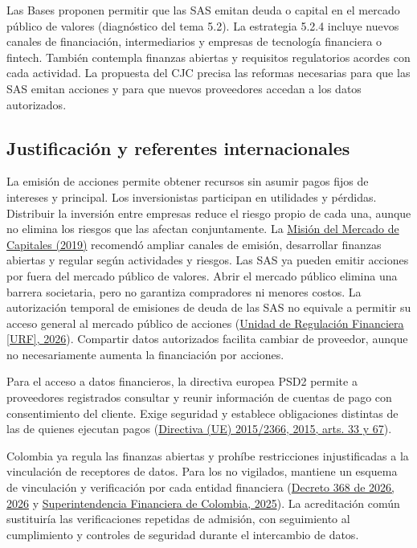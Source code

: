 Las Bases proponen permitir que las SAS emitan deuda o capital en el mercado público de valores (diagnóstico del tema 5.2). La estrategia 5.2.4 incluye nuevos canales de financiación, intermediarios y empresas de tecnología financiera o fintech. También contempla finanzas abiertas y requisitos regulatorios acordes con cada actividad. La propuesta del CJC precisa las reformas necesarias para que las SAS emitan acciones y para que nuevos proveedores accedan a los datos autorizados.

\subsection{Justificación y referentes internacionales}

La emisión de acciones permite obtener recursos sin asumir pagos fijos de intereses y principal. Los inversionistas participan en utilidades y pérdidas. Distribuir la inversión entre empresas reduce el riesgo propio de cada una, aunque no elimina los riesgos que las afectan conjuntamente. La \hyperref[ref:bib:mision2019]{Misión del Mercado de Capitales (2019)} recomendó ampliar canales de emisión, desarrollar finanzas abiertas y regular según actividades y riesgos. Las SAS ya pueden emitir acciones por fuera del mercado público de valores. Abrir el mercado público elimina una barrera societaria, pero no garantiza compradores ni menores costos. La autorización temporal de emisiones de deuda de las SAS no equivale a permitir su acceso general al mercado público de acciones (\hyperref[ref:bib:urf_sas2026]{Unidad de Regulación Financiera [URF], 2026}). Compartir datos autorizados facilita cambiar de proveedor, aunque no necesariamente aumenta la financiación por acciones.

Para el acceso a datos financieros, la directiva europea PSD2 permite a proveedores registrados consultar y reunir información de cuentas de pago con consentimiento del cliente. Exige seguridad y establece obligaciones distintas de las de quienes ejecutan pagos (\href{https://eur-lex.europa.eu/legal-content/ES-EN/TXT/?from=EN&uri=CELEX\%3A32015L2366}{Directiva (UE) 2015/2366, 2015, arts. 33 y 67}).

Colombia ya regula las finanzas abiertas y prohíbe restricciones injustificadas a la vinculación de receptores de datos. Para los no vigilados, mantiene un esquema de vinculación y verificación por cada entidad financiera (\hyperref[ref:bib:decreto368]{Decreto 368 de 2026, 2026} y \hyperref[ref:bib:sfc_cbj2025]{Superintendencia Financiera de Colombia, 2025}). La acreditación común sustituiría las verificaciones repetidas de admisión, con seguimiento al cumplimiento y controles de seguridad durante el intercambio de datos.

